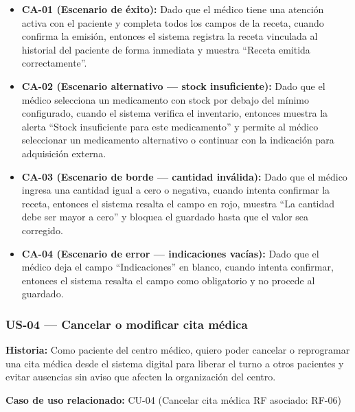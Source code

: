 \documentclass[11pt,a4paper]{article}
\providecommand{\tightlist}{%
	\setlength{\itemsep}{0pt}\setlength{\parskip}{0pt}}
\begin{document}
	\begin{itemize}
		\tightlist
		\item
		\textbf{CA-01 (Escenario de éxito):} Dado que el médico tiene una atención activa con el paciente y completa todos los campos de la receta, cuando confirma la emisión, entonces el sistema registra la receta vinculada al historial del paciente de forma inmediata y muestra ``Receta emitida correctamente''.
		\item
		\textbf{CA-02 (Escenario alternativo --- stock insuficiente):} Dado que el médico selecciona un medicamento con stock por debajo del mínimo configurado, cuando el sistema verifica el inventario, entonces muestra la alerta ``Stock insuficiente para este medicamento'' y permite al médico seleccionar un medicamento alternativo o continuar con la indicación para adquisición externa.
		\item
		\textbf{CA-03 (Escenario de borde --- cantidad inválida):} Dado que el médico ingresa una cantidad igual a cero o negativa, cuando intenta confirmar la receta, entonces el sistema resalta el campo en rojo, muestra ``La cantidad debe ser mayor a cero'' y bloquea el guardado hasta que el valor sea corregido.
		\item
		\textbf{CA-04 (Escenario de error --- indicaciones vacías):} Dado que el médico deja el campo ``Indicaciones'' en blanco, cuando intenta confirmar, entonces el sistema resalta el campo como obligatorio y no procede al guardado.
	\end{itemize}
	
	\subsubsection{US-04 --- Cancelar o modificar cita médica}
	
	\textbf{Historia:} Como paciente del centro médico, quiero poder cancelar o reprogramar una cita médica desde el sistema digital para liberar el turno a otros pacientes y evitar ausencias sin aviso que afecten la organización del centro.
	
	\textbf{Caso de uso relacionado:} CU-04 (Cancelar cita médica \textbar{} RF asociado: RF-06)
	
\end{document}
